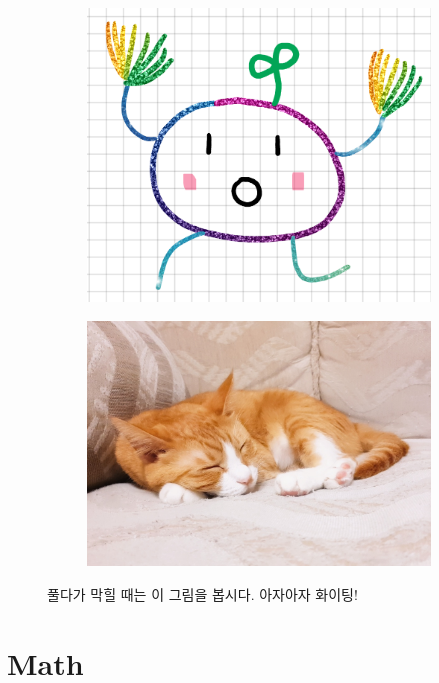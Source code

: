 \documentclass[landscape, 8pt, a4paper, oneside, twocolumn]{extarticle}
\begin{document}
\begin{figure}[H]
    \centering
    \begin{subfigure}{0.22\textwidth}
        \centering
        \includegraphics[width=0.95\linewidth]{./cheer_potato.png}
    \end{subfigure}
    \begin{subfigure}{0.22\textwidth}
        \centering
        \includegraphics[width=0.95\linewidth]{./mango.jpg}
    \end{subfigure}
    \caption{풀다가 막힐 때는 이 그림을 봅시다. 아자아자 화이팅!}
\end{figure}
\newpage
\section{Math}
\end{document}
